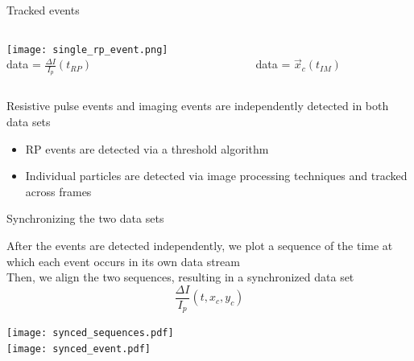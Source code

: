 \begin{frame}[c]{Tracked events}

	\begin{columns}[t]
		\begin{column}[T]{2.25in}
			{\centering 
				\texttt{[image: single\_rp\_event.png]} \\
				data = $\frac{\Delta I}{I_{p}}\left(t_{RP}\right)$ \\
				\par
			}
		\end{column}
		
		
		\begin{column}[T]{2.25in}
			{\centering 
				 \\
				\vspace{.25in}
				data = $\vec{x}_{c}\left(t_{IM}\right)$
				\par
			}
		\end{column}
	\end{columns}
	\vspace{.2in}
	
	Resistive pulse events and imaging events are independently detected in both data sets
	\begin{itemize}
		\item RP events are detected via a threshold algorithm
		\item Individual particles are detected via image processing techniques and tracked across frames
	\end{itemize}
	

\end{frame}





\begin{frame}[c]{Synchronizing the two data sets}

	{\scriptsize
		After the events are detected independently, we plot a sequence of the time at which each event occurs in its own data stream \\
		Then, we align the two sequences, resulting in a synchronized data set \\
		\[ \frac{\Delta I}{I_{p}}\left(t, x_{c}, y_{c}\right) \]
	}
	
	{\centering
		\texttt{[image: synced\_sequences.pdf]} \\
		\vspace{.2in}
		\texttt{[image: synced\_event.pdf]} \\
		\par
	}
	
	

\end{frame}


